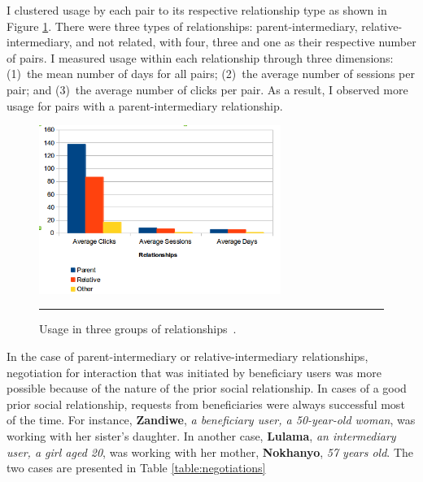 I clustered usage by each pair to its respective relationship type as shown in Figure \ref{figure:relation}. There were three types of relationships: parent-intermediary, relative-intermediary, and not related, with four, three and one as their respective number of pairs. I measured usage within each relationship through three dimensions: (1)~the mean number of days for all pairs; (2)~the average number of sessions per pair; and (3)~the average number of clicks per pair. As a result, I observed more usage for pairs with a parent-intermediary relationship. 
\begin{figure}[htbp]
  \centering
    \includegraphics[width=0.7\textwidth]{Figures/relationships.png}
    \rule{35em}{0.5pt}
  \caption{Usage in three groups of relationships~\citep{katule2016leveraging}.}
  \label{figure:relation}
\end{figure}
In the case of parent-intermediary or relative-intermediary relationships, negotiation for interaction that was initiated by beneficiary users was more possible because of the nature of the prior social relationship. In cases of a good prior social relationship, requests from beneficiaries were always successful most of the time. For instance, \textbf{Zandiwe}, \emph{a beneficiary user, a 50-year-old woman}, was working with her sister's daughter. In another case, \textbf{Lulama}, \emph{an intermediary user, a girl aged 20}, was working with her mother, \textbf{Nokhanyo}, \emph{57 years old}. The two cases are presented in Table \ref{table:negotiations}

